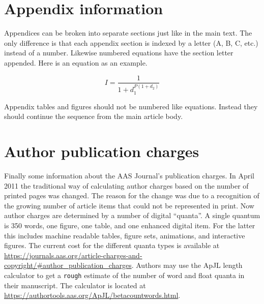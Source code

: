 \documentclass{aastex63}
\begin{document}


\appendix

\section{Appendix information}

Appendices can be broken into separate sections just like in the main text.
The only difference is that each appendix section is indexed by a letter
(A, B, C, etc.) instead of a number.  Likewise numbered equations have
the section letter appended.  Here is an equation as an example.

\begin{equation}
I = \frac{1}{1 + d_{1}^{P (1 + d_{2} )}}
\end{equation}

Appendix tables and figures should not be numbered like equations. Instead
they should continue the sequence from the main article body.

\section{Author publication charges} \label{sec:pubcharge}

Finally some information about the AAS Journal's publication charges.
In April 2011 the traditional way of calculating author charges based on 
the number of printed pages was changed.  The reason for the change
was due to a recognition of the growing number of article items that could not 
be represented in print. Now author charges are determined by a number of
digital ``quanta''.  A single quantum is 350 words, one figure, one table,
and one enhanced digital item.  For the latter this includes machine readable
tables, figure sets, animations, and interactive figures.  The current cost
for the different quanta types is available at 
\url{https://journals.aas.org/article-charges-and-copyright/#author_publication_charges}. 
Authors may use the ApJL length calculator to get a {\tt rough} estimate of 
the number of word and float quanta in their manuscript. The calculator 
is located at \url{https://authortools.aas.org/ApJL/betacountwords.html}.
\end{document}
